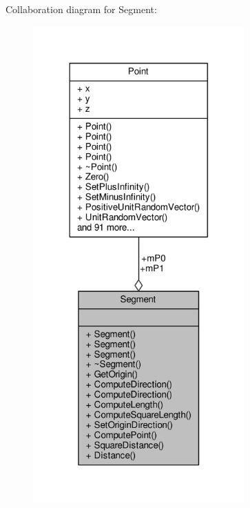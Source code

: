 Collaboration diagram for Segment\+:
\nopagebreak
\begin{figure}[H]
\begin{center}
\leavevmode
\includegraphics[width=230pt]{de/d20/classSegment__coll__graph}
\end{center}
\end{figure}
